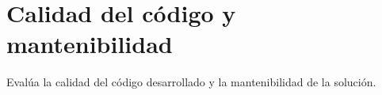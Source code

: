\section{Calidad del código y mantenibilidad}

Evalúa la calidad del código desarrollado y la mantenibilidad de la solución.